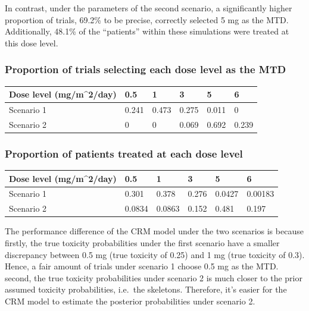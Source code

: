 \documentclass[
]{article}
\begin{document}
In contrast, under the parameters of the second scenario, a
significantly higher proportion of trials, 69.2\% to be precise,
correctly selected 5 mg as the MTD. Additionally, 48.1\% of the
``patients'' within these simulations were treated at this dose level.

\hypertarget{proportion-of-trials-selecting-each-dose-level-as-the-mtd}{%
\subsubsection{Proportion of trials selecting each dose level as the
MTD}\label{proportion-of-trials-selecting-each-dose-level-as-the-mtd}}

\begin{longtable}[]{@{}llllll@{}}
\toprule()
Dose level (mg/m\^{}2/day) & 0.5 & 1 & 3 & 5 & 6 \\
\midrule()
\endhead
Scenario 1 & 0.241 & 0.473 & 0.275 & 0.011 & 0 \\
Scenario 2 & 0 & 0 & 0.069 & 0.692 & 0.239 \\
\bottomrule()
\end{longtable}

\hypertarget{proportion-of-patients-treated-at-each-dose-level}{%
\subsubsection{Proportion of patients treated at each dose
level}\label{proportion-of-patients-treated-at-each-dose-level}}

\begin{longtable}[]{@{}llllll@{}}
\toprule()
Dose level (mg/m\^{}2/day) & 0.5 & 1 & 3 & 5 & 6 \\
\midrule()
\endhead
Scenario 1 & 0.301 & 0.378 & 0.276 & 0.0427 & 0.00183 \\
Scenario 2 & 0.0834 & 0.0863 & 0.152 & 0.481 & 0.197 \\
\bottomrule()
\end{longtable}

The performance difference of the CRM model under the two scenarios is
because firstly, the true toxicity probabilities under the first
scenario have a smaller discrepancy between 0.5 mg (true toxicity of
0.25) and 1 mg (true toxicity of 0.3). Hence, a fair amount of trials
under scenario 1 choose 0.5 mg as the MTD. second, the true toxicity
probabilities under scenario 2 is much closer to the prior assumed
toxicity probabilities, i.e.~the skeletons. Therefore, it's easier for
the CRM model to estimate the posterior probabilities under scenario 2.
\end{document}

